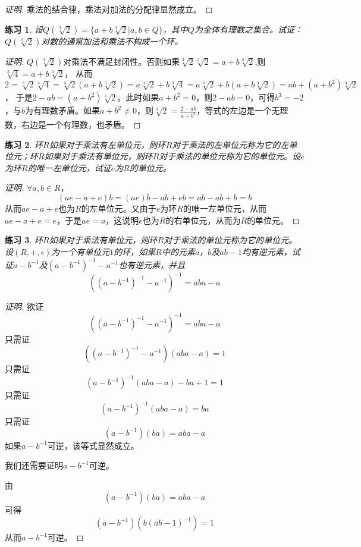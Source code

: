 \documentclass{article}
\newtheorem{Exercise}{练习}
\begin{document}
\begin{CJK*}{UTF8}{gbsn}
\begin{proof}[证明]
  乘法的结合律，乘法对加法的分配律显然成立。
\end{proof}
\begin{Exercise}
  设$Q(\sqrt[3]{2})=\{a+b\sqrt[3]{2}|a,b\in Q\}$，其中$Q$为全体有理数之集合。试证：$Q(\sqrt[3]{2})$对数的通常加法和乘法不构成一个环。
\end{Exercise}
\begin{proof}[证明]
  $Q(\sqrt[3]{2})$对乘法不满足封闭性。否则如果$\sqrt[3]{2}\sqrt[3]{2}=a+b\sqrt[3]{2}$,则$\sqrt[3]{4}=a+b\sqrt[3]{2}$，
  从而$2=\sqrt[3]{2}\sqrt[3]{4}=\sqrt[3]{2}(a+b\sqrt[3]{2})=a\sqrt[3]{2}+b\sqrt[3]{4}=a\sqrt[3]{2}+b(a+b\sqrt[3]{2})=ab+(a+b^2)\sqrt[3]{2}$，
  于是$2-ab=(a+b^2)\sqrt[3]{2}$。此时如果$a+b^2=0$，则$2-ab=0$，可得$b^3=-2$，与$b$为有理数矛盾。如果$a+b^2\neq 0$，则$\sqrt[3]{2}=\frac{2-ab}{a+b^2}$，等式的左边是一个无理数，右边是一个有理数，也矛盾。
\end{proof}
\begin{Exercise}
  环$R$如果对于乘法有左单位元，则环$R$对于乘法的左单位元称为它的左单位元；环$R$如果对于乘法有单位元，则环$R$对于乘法的单位元称为它的单位元。设$e$为环$R$的唯一左单位元，试证$e$为$R$的单位元。
\end{Exercise}
\begin{proof}[证明]
  $\forall a,b\in R$，
  \[(ae-a+e)b=(ae)b-ab+eb=ab-ab+b=b\]
  从而$ae-a+e$也为$R$的左单位元。又由于$e$为环$R$的唯一左单位元，从而$ae-a+e=e$，于是$ae=a$，这说明$e$也为$R$的右单位元，从而为$R$的单位元。
\end{proof}
\begin{Exercise}
  环$R$如果对于乘法有单位元，则环$R$对于乘法的单位元称为它的单位元。设$(R,+,\circ)$为一个有单位元$1$的环，如果$R$中的元素$a$，$b$及$ab-1$均有逆元素，试证$a-b^{-1}$及$(a-b^{-1})^{-1}-a^{-1}$也有逆元素，并且
\[((a-b^{-1})^{-1}-a^{-1})^{-1}=aba-a\]
\end{Exercise}
\begin{proof}[证明]
  欲证
  \[((a-b^{-1})^{-1}-a^{-1})^{-1}=aba-a\]
  只需证
  \[((a-b^{-1})^{-1}-a^{-1})(aba-a)=1\]
  只需证
  \[(a-b^{-1})^{-1}(aba-a)-ba+1=1\]
  只需证
  \[(a-b^{-1})^{-1}(aba-a)=ba\]
  只需证
  \[(a-b^{-1})(ba)=aba-a\]
  如果$a-b^{-1}$可逆，该等式显然成立。

  我们还需要证明$a-b^{-1}$可逆。

  由
  \[(a-b^{-1})(ba)=aba-a\]
  可得
  \[(a-b^{-1})(b(ab-1)^{-1})=1\]
  从而$a-b^{-1}$可逆。


\end{proof}
\end{CJK*}
\end{document}
